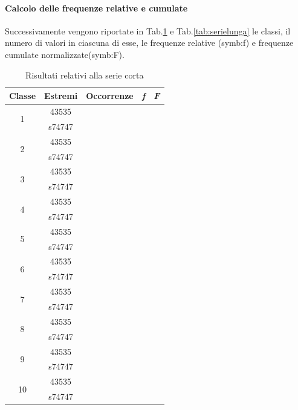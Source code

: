 \paragraph{Calcolo delle frequenze relative e cumulate}
Successivamente vengono riportate in Tab.\ref{tab:seriecorta} e Tab.\ref{tab:serielunga}
le classi, il numero di valori in ciascuna di esse, le frequenze relative (\gls{symb:f}) e frequenze cumulate normalizzate(\gls{symb:F}).

\begin{table}[H]
	\centering
	\begin{tabular}{c|c|c|c|c}
		\toprule
		\toprule
		\textbf{Classe}&\textbf{Estremi} &\textbf{Occorrenze}&\textbf{\textit{f}}&\textbf{\textit{F}}\\
		\midrule
		\midrule
		\multirow{2}{*}{1}&43535&\multirow{2}{*}{}&\multirow{2}{*}{}&\multirow{2}{*}{} \\
		&s74747&&&\\
		\midrule
		\multirow{2}{*}{2}&43535&\multirow{2}{*}{}&\multirow{2}{*}{}&\multirow{2}{*}{} \\
		&s74747&&&\\
		\midrule
		\multirow{2}{*}{3}&43535&\multirow{2}{*}{}&\multirow{2}{*}{}&\multirow{2}{*}{} \\
		&s74747&&&\\
		\midrule
		\multirow{2}{*}{4}&43535&\multirow{2}{*}{}&\multirow{2}{*}{}&\multirow{2}{*}{} \\
		&s74747&&&\\
		\midrule
		\multirow{2}{*}{5}&43535&\multirow{2}{*}{}&\multirow{2}{*}{}&\multirow{2}{*}{} \\
		&s74747&&&\\
		\midrule
		\multirow{2}{*}{6}&43535&\multirow{2}{*}{}&\multirow{2}{*}{}&\multirow{2}{*}{} \\
		&s74747&&&\\
		\midrule
		\multirow{2}{*}{7}&43535&\multirow{2}{*}{}&\multirow{2}{*}{}&\multirow{2}{*}{} \\
		&s74747&&&\\
		\midrule
		\multirow{2}{*}{8}&43535&\multirow{2}{*}{}&\multirow{2}{*}{}&\multirow{2}{*}{} \\
		&s74747&&&\\
		\midrule
		\multirow{2}{*}{9}&43535&\multirow{2}{*}{}&\multirow{2}{*}{}&\multirow{2}{*}{} \\
		&s74747&&&\\
		\midrule
		\multirow{2}{*}{10}&43535&\multirow{2}{*}{}&\multirow{2}{*}{}&\multirow{2}{*}{} \\
		&s74747&&&\\
		\midrule
		\bottomrule
		\bottomrule
	\end{tabular}
\caption{Risultati relativi alla serie corta}
\label{tab:seriecorta}
\end{table} 
